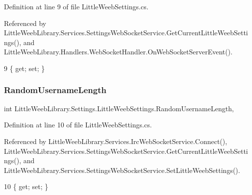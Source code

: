 Definition at line 9 of file Little\+Weeb\+Settings.\+cs.



Referenced by Little\+Weeb\+Library.\+Services.\+Settings\+Web\+Socket\+Service.\+Get\+Current\+Little\+Weeb\+Settings(), and Little\+Weeb\+Library.\+Handlers.\+Web\+Socket\+Handler.\+On\+Web\+Socket\+Server\+Event().


\begin{DoxyCode}
9 \{ \textcolor{keyword}{get}; \textcolor{keyword}{set}; \} 
\end{DoxyCode}
\mbox{\label{class_little_weeb_library_1_1_settings_1_1_little_weeb_settings_a0826aad7341af901477ce991359129d4}} 
\subsubsection{\texorpdfstring{Random\+Username\+Length}{RandomUsernameLength}}
{\footnotesize\ttfamily int Little\+Weeb\+Library.\+Settings.\+Little\+Weeb\+Settings.\+Random\+Username\+Length\hspace{0.3cm}{\ttfamily [get]}, {\ttfamily [set]}}



Definition at line 10 of file Little\+Weeb\+Settings.\+cs.



Referenced by Little\+Weeb\+Library.\+Services.\+Irc\+Web\+Socket\+Service.\+Connect(), Little\+Weeb\+Library.\+Services.\+Settings\+Web\+Socket\+Service.\+Get\+Current\+Little\+Weeb\+Settings(), and Little\+Weeb\+Library.\+Services.\+Settings\+Web\+Socket\+Service.\+Set\+Little\+Weeb\+Settings().


\begin{DoxyCode}
10 \{ \textcolor{keyword}{get}; \textcolor{keyword}{set}; \}
\end{DoxyCode}
\mbox{\label{class_little_weeb_library_1_1_settings_1_1_little_weeb_settings_a22ae8b2dc7e6bb5e0b3b0220484c4c86}} 
